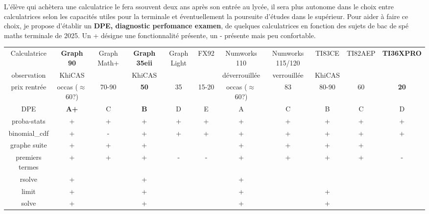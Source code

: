\documentclass{article}
\begin{document}
\begin{giacjshere}
L'élève
qui achètera une calculatrice le fera ssouvent deux ans après son entrée
au lycée,
il sera plus autonome dans le choix  entre calculatrices
selon les capacités utiles pour la terminale et éventuellement la poursuite
d'études dans le supérieur. Pour aider à faire ce choix,
je propose d'établir un 
{\bf DPE, diagnostic perfomance examen}, de quelques calculatrices
en fonction des sujets de bac de spé maths terminale de 2025.
Un + désigne une fonctionnalité présente, un - présente mais peu confortable.
\begin{center}
\begin{tabular}{|c|c|c|c|c|c|c|c|c|c|c|} \hline 
Calculatrice   &{\bf Graph 90}& Graph Math+&{\bf Graph 35eii}& Graph Light & FX92 & Numworks 110 & Numworks 115/120 & TI83CE &TI82AEP& {\bf TI36XPRO} \\ 
observation    & KhiCAS   &             & KhiCAS      &             &      & déverrouillée&verrouillée       & KhiCAS & \\
prix rentrée   & occas ($\approx$60?) & 70-90    & {\bf 50}          &   35        & 15-20 & occas ($\approx$60?)  &  83            &  80-90  & 60  & {\bf 20} \\
DPE            &  {\bf A+}  &  C          &  {\bf B}        &   D         & E    & A            &    C             & B      &  C   &  D \\
proba-stats    & +        & +           &  +          &  +          &  +   & +            &    +             &  +     & +    &   + \\ 
binomial\_cdf  & +        & -           &  +          &   +         &  +   &  +           &    +             &  +     & +    &   + \\ 
graphe suite   &  +       & +           &  +          &             &     &   +          &     +            &   +    &  +   &    \\ 
premiers termes&  +       & +           &  +          &   -         &  -   & +            &    +             &  +     & +    &   - \\ 
rsolve         &   +      &             &   +         &             &      &  +           &                  &        &      &    \\ 
limit          &   +      &             &   +         &             &      &  +           &                  &  +     &      &    \\ 
solve          & +        &             &  +          &             &      &  +           &                  &  +     &      &    \\ 

\end{tabular}
\end{center}
\end{giacjshere}
\end{document}
